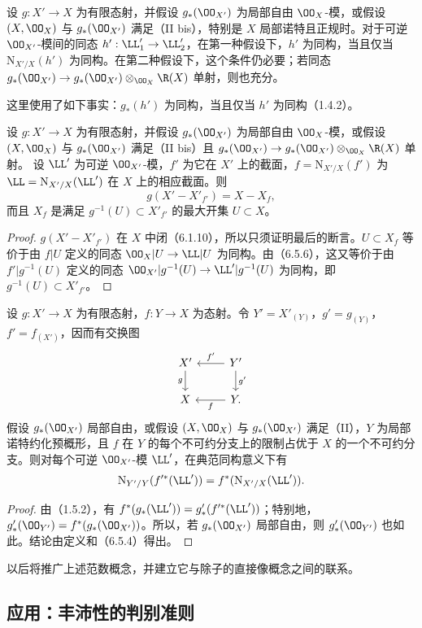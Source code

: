 设 $g:X'\to X$ 为有限态射，并假设 $g_*(\OO_{X'})$ 为局部自由 $\OO_X$-模，或假设 $(X,\OO_X)$ 与 $g_*(\OO_{X'})$ 满足（II bis），特别是 $X$ 局部诺特且正规时。对于可逆 $\OO_{X'}$-模间的同态 $h':\LL'_1\to\LL'_2$，在第一种假设下，$h'$ 为同构，当且仅当 $\mathrm N_{X'/X}(h')$ 为同构。在第二种假设下，这个条件仍必要；若同态
$g_*(\OO_{X'})\to g_*(\OO_{X'})\otimes_{\OO_X}\R(X)$ 单射，则也充分。

这里使用了如下事实：$g_*(h')$ 为同构，当且仅当 $h'$ 为同构（1.4.2）。

设 $g:X'\to X$ 为有限态射，并假设 $g_*(\OO_{X'})$ 为局部自由 $\OO_X$-模，或假设 $(X,\OO_X)$ 与 $g_*(\OO_{X'})$ 满足（II bis）且
$g_*(\OO_{X'})\to g_*(\OO_{X'})\otimes_{\OO_X}\R(X)$ 单射。
设 $\LL'$ 为可逆 $\OO_{X'}$-模，$f'$ 为它在 $X'$ 上的截面，$f=\mathrm N_{X'/X}(f')$ 为 $\LL=\mathrm N_{X'/X}(\LL')$ 在 $X$ 上的相应截面。则
\[
g(X'-X'_{f'})=X-X_f,
\]
而且 $X_f$ 是满足 $g^{-1}(U)\subset X'_{f'}$ 的最大开集 $U\subset X$。
\begin{proof}
$g(X'-X'_{f'})$ 在 $X$ 中闭（6.1.10），所以只须证明最后的断言。$U\subset X_f$ 等价于由 $f|U$ 定义的同态 $\OO_X|U\to\LL|U$ 为同构。由（6.5.6），这又等价于由 $f'|g^{-1}(U)$ 定义的同态
$\OO_{X'}|g^{-1}(U)\to\LL'|g^{-1}(U)$ 为同构，即 $g^{-1}(U)\subset X'_{f'}$。
\end{proof}

设 $g:X'\to X$ 为有限态射，$f:Y\to X$ 为态射。令 $Y'=X'_{(Y)}$，$g'=g_{(Y)}$，$f'=f_{(X')}$，因而有交换图
\[
\begin{tikzcd}
X'\arrow[d,"g"']&Y'\arrow[l,"f'"']\arrow[d,"g'"]\\
X&Y.\arrow[l,"f"]
\end{tikzcd}
\]
假设 $g_*(\OO_{X'})$ 局部自由，或假设 $(X,\OO_X)$ 与 $g_*(\OO_{X'})$ 满足（II），$Y$ 为局部诺特约化预概形，且 $f$ 在 $Y$ 的每个不可约分支上的限制占优于 $X$ 的一个不可约分支。则对每个可逆 $\OO_{X'}$-模 $\LL'$，在典范同构意义下有
\[
\mathrm N_{Y'/Y}(f'^*(\LL'))=f^*(\mathrm N_{X'/X}(\LL')).
\]
\begin{proof}
由（1.5.2），有 $f^*(g_*(\LL'))=g'_*(f'^*(\LL'))$；特别地，$g'_*(\OO_{Y'})=f^*(g_*(\OO_{X'}))$。所以，若 $g_*(\OO_{X'})$ 局部自由，则 $g'_*(\OO_{Y'})$ 也如此。结论由定义和（6.5.4）得出。
\end{proof}

以后将推广上述范数概念，并建立它与除子的直接像概念之间的联系。

\subsection{应用：丰沛性的判别准则}

